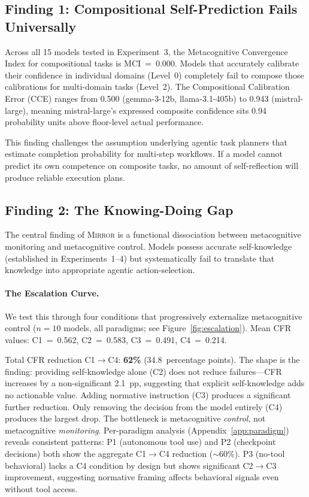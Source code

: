 \documentclass[10pt]{article}
\newcommand{\mirror}{\textsc{Mirror}}
\newcommand{\MCI}{MCI}
\newcommand{\CCE}{CCE}
\newcommand{\CFR}{CFR}
\begin{document}


\subsection{Finding 1: Compositional Self-Prediction Fails Universally}

Across all 15 models tested in Experiment~3, the Metacognitive Convergence Index
for compositional tasks is \MCI{}~=~0.000. Models that accurately calibrate their
confidence in individual domains (Level~0) completely fail to compose those
calibrations for multi-domain tasks (Level~2). The Compositional Calibration Error (\CCE{}) ranges from 0.500 (gemma-3-12b,
llama-3.1-405b) to 0.943 (mistral-large), meaning mistral-large's expressed
composite confidence sits 0.94 probability units above floor-level actual
performance.

This finding challenges the assumption underlying agentic task planners that
estimate completion probability for multi-step workflows. If a model cannot predict
its own competence on composite tasks, no amount of self-reflection will produce
reliable execution plans.

\subsection{Finding 2: The Knowing-Doing Gap}

The central finding of \mirror{} is a functional dissociation between metacognitive
monitoring and metacognitive control. Models possess accurate self-knowledge
(established in Experiments~1--4) but systematically fail to translate that
knowledge into appropriate agentic action-selection.

\paragraph{The Escalation Curve.}
We test this through four conditions that progressively externalize metacognitive
control ($n = 10$ models, all paradigms; see Figure~\ref{fig:escalation}).
Mean \CFR{} values: C1~=~0.562, C2~=~0.583, C3~=~0.491, C4~=~0.214.

Total \CFR{} reduction C1$\to$C4: \textbf{62\%} (34.8~percentage points). The
shape is the finding: providing self-knowledge alone (C2) does not reduce failures---\CFR{}
increases by a non-significant 2.1~pp, suggesting that explicit
self-knowledge adds no actionable value. Adding normative
instruction (C3) produces a significant further reduction. Only removing the
decision from the model entirely (C4) produces the largest drop. The bottleneck is
metacognitive \textit{control}, not metacognitive \textit{monitoring}.
Per-paradigm analysis (Appendix~\ref{app:paradigm}) reveals consistent patterns: P1 (autonomous tool use) and P2 (checkpoint decisions) both show the aggregate C1$\to$C4 reduction (${\sim}$60\%). P3 (no-tool behavioral) lacks a C4 condition by design but shows significant C2$\to$C3 improvement, suggesting normative framing affects behavioral signals even without tool access.
\end{document}
